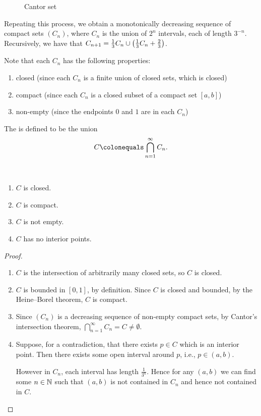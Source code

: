 \begin{figure}[H]
\centering
{}
\caption{Cantor set}
\end{figure}

Repeating this process, we obtain a monotonically decreasing sequence of compact sets $(C_n)$, where $C_n$ is the union of $2^n$ intervals, each of length $3^{-n}$. Recursively, we have that $C_{n+1}=\frac{1}{3}C_n\cup\left(\frac{1}{3}C_n+\frac{2}{3}\right)$.

Note that each $C_n$ has the following properties:
\begin{enumerate}[label=(\roman*)]
\item closed (since each $C_n$ is a finite union of closed sets, which is closed)
\item compact (since each $C_n$ is a closed subset of a compact set $[a,b]$)
\item non-empty (since the endpoints $0$ and $1$ are in each $C_n$)
\end{enumerate}

The  is defined to be the union
\[C\colonequals\bigcap_{n=1}^{\infty}C_n.\]

\begin{lemma} \
\begin{enumerate}[label=(\roman*)]
\item $C$ is closed.
\item $C$ is compact.
\item $C$ is not empty.
\item $C$ has no interior points.
\end{enumerate}
\end{lemma}

\begin{proof} \
\begin{enumerate}[label=(\roman*)]
\item $C$ is the intersection of arbitrarily many closed sets, so $C$ is closed.
\item $C$ is bounded in $[0,1]$, by definition. Since $C$ is closed and bounded, by the Heine--Borel theorem, $C$ is compact.
\item Since $(C_n)$ is a decreasing sequence of non-empty compact sets, by Cantor's intersection theorem, $\bigcap_{n=1}^{\infty}C_n=C\neq\emptyset$.
\item Suppose, for a contradiction, that there exists $p\in C$ which is an interior point. Then there exists some open interval around $p$, i.e., $p\in(a,b)$.

However in $C_n$, each interval has length $\frac{1}{3^n}$. Hence for any $(a,b)$ we can find some $n\in\mathbb N$ such that $(a,b)$ is not contained in $C_n$ and hence not contained in $C$.
\end{enumerate}
\end{proof}

